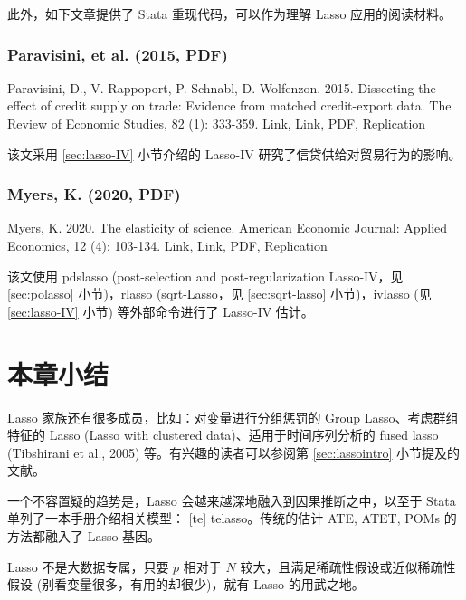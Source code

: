 {此外，如下文章提供了 Stata 重现代码，可以作为理解 Lasso 应用的阅读材料。

\subsubsection{Paravisini, et al. (2015, PDF)}

Paravisini, D., V. Rappoport, P. Schnabl, D. Wolfenzon. 2015. Dissecting the effect of credit supply on trade: Evidence from matched credit-export data. The Review of Economic Studies, 82 (1): 333-359. Link, Link, PDF, Replication

该文采用 \ref{sec:lasso-IV} 小节介绍的 Lasso-IV 研究了信贷供给对贸易行为的影响。  

\subsubsection{Myers, K. (2020, PDF)}

Myers, K. 2020. The elasticity of science. American Economic Journal: Applied Economics, 12 (4): 103-134. Link, Link, PDF, Replication

该文使用 pdslasso (post-selection and post-regularization Lasso-IV，见 \ref{sec:polasso} 小节)，rlasso (sqrt-Lasso，见 \ref{sec:sqrt-lasso} 小节)，ivlasso (见 \ref{sec:lasso-IV} 小节) 等外部命令进行了 Lasso-IV 估计。
  


\section{本章小结}

Lasso 家族还有很多成员，比如：对变量进行分组惩罚的 Group Lasso、考虑群组特征的 Lasso (Lasso with clustered data)、适用于时间序列分析的 fused lasso (Tibshirani et al., 2005) 等。有兴趣的读者可以参阅第 \ref{sec:lassointro} 小节提及的文献。

一个不容置疑的趋势是，Lasso 会越来越深地融入到因果推断之中，以至于 Stata 单列了一本手册介绍相关模型： [te] telasso。传统的估计 ATE, ATET, POMs 的方法都融入了 Lasso 基因。

Lasso 不是大数据专属，只要 $p$ 相对于 $N$ 较大，且满足稀疏性假设或近似稀疏性假设 (别看变量很多，有用的却很少)，就有  Lasso  的用武之地。




%
%



}
